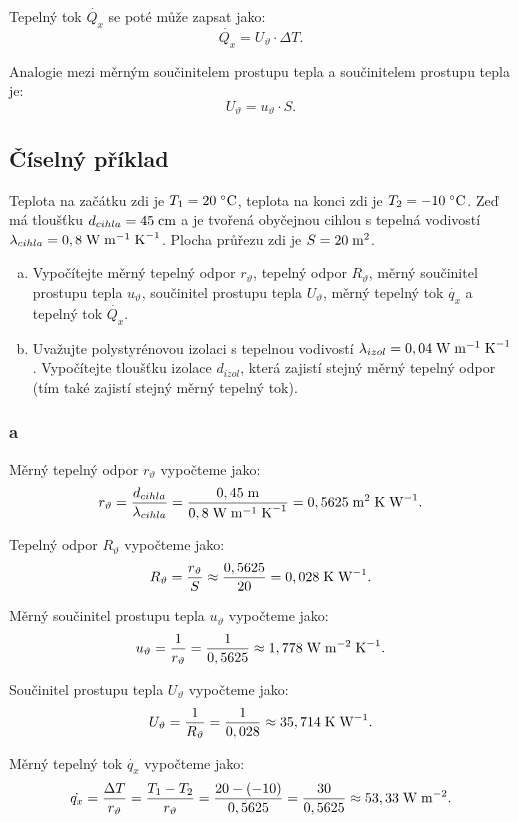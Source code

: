 \documentclass{article}
\begin{document}
Tepelný tok $\dot{Q_x}$ se poté může zapsat jako:
$$
    \dot{Q_x} = U_{\vartheta} \cdot \Delta T.
$$

Analogie mezi měrným součinitelem prostupu tepla a součinitelem prostupu tepla je:
$$
    U_{\vartheta} = u_{\vartheta} \cdot S.
$$


\subsection{Číselný příklad}
Teplota na začátku zdi je $T_1 = 20 \; ^\circ \textrm{C}$, teplota na konci zdi je $T_2 = -10 \; ^\circ \textrm{C}$. Zeď má tloušťku $d_{cihla} = 45 \; \textrm{cm}$ a je tvořená obyčejnou cihlou s tepelná vodivostí $\lambda_{cihla} = 0,8 \; \textrm{W} \; \textrm{m}^{-1} \; \textrm{K}^{-1}$. Plocha průřezu zdi je $S = 20 \; \textrm{m}^{\textrm{2}}$.

\begin{enumerate}[a)]
    \item Vypočítejte měrný tepelný odpor $r_{\vartheta}$,
          tepelný odpor $R_{\vartheta}$, měrný součinitel prostupu tepla $u_{\vartheta}$, součinitel prostupu tepla $U_{\vartheta}$, měrný tepelný tok $\dot{q_x}$ a tepelný tok $\dot{Q_x}$.
    \item Uvažujte polystyrénovou izolaci s tepelnou vodivostí $\lambda_{izol} = 0,04 \; \textrm{W} \; \textrm{m}^{-1} \; \textrm{K}^{-1}$. Vypočítejte tloušťku izolace $d_{izol}$, která zajistí stejný měrný tepelný odpor (tím také zajistí stejný měrný tepelný tok).
\end{enumerate}

\subsubsection{a}
Měrný tepelný odpor $r_{\vartheta}$ vypočteme jako:
$$
    r_{\vartheta} = \frac{d_{cihla}}{\lambda_{cihla}} = \frac{0,45 \; \textrm{m}}{0,8 \; \textrm{W} \; \textrm{m}^{-1} \; \textrm{K}^{-1}} = 0,5625 \; \textrm{m}^{\textrm{2}} \; \textrm{K} \; \textrm{W}^{-1}.
$$

Tepelný odpor $R_{\vartheta}$ vypočteme jako:
$$
    R_{\vartheta} = \frac{r_{\vartheta}}{S} \approx \frac{0,5625}{20} = 0,028 \; \textrm{K} \; \textrm{W}^{-1}.
$$

Měrný součinitel prostupu tepla $u_{\vartheta}$ vypočteme jako:
$$
    u_{\vartheta} = \frac{1}{r_{\vartheta}} = \frac{1}{0,5625} \approx 1,778 \; \textrm{W} \; \textrm{m}^{-2} \; \textrm{K}^{-1}.
$$

Součinitel prostupu tepla $U_{\vartheta}$ vypočteme jako:
$$
    U_{\vartheta} = \frac{1}{R_{\vartheta}} = \frac{1}{0,028} \approx 35,714 \; \textrm{K} \; \textrm{W}^{-1}.
$$

Měrný tepelný tok $\dot{q_x}$ vypočteme jako:
$$
    \dot{q_x} = \frac{\Delta T}{r_{\vartheta}} = \frac{T_1 - T_2}{r_{\vartheta}} = \frac{20 - (-10)}{0,5625} = \frac{30}{0,5625} \approx 53,33 \; \textrm{W} \; \textrm{m}^{-2}.
$$
\end{document}
